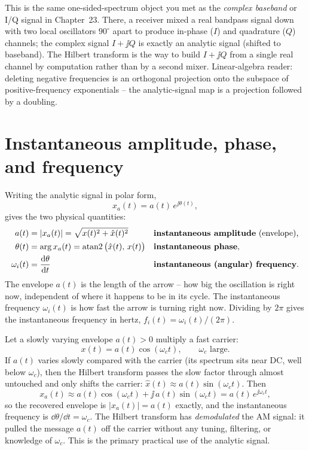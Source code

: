 \begin{connectionbox}
This is the same one-sided-spectrum object you met as the \emph{complex baseband} or I/Q
signal in Chapter~23. There, a receiver mixed a real bandpass signal down with two local
oscillators $90^\circ$ apart to produce in-phase ($I$) and quadrature ($Q$) channels;
the complex signal $I + \jj Q$ is exactly an analytic signal (shifted to baseband). The
Hilbert transform is the way to build $I + \jj Q$ from a single real channel by
computation rather than by a second mixer. Linear-algebra reader: deleting negative
frequencies is an orthogonal projection onto the subspace of positive-frequency
exponentials -- the analytic-signal map is a projection followed by a doubling.
\end{connectionbox}

\section{Instantaneous amplitude, phase, and frequency}
\label{ch25:instantaneous}

Writing the analytic signal in polar form,
\begin{equation}
\label{ch25:polar}
x_a(t) = a(t)\, e^{\jj\theta(t)},
\end{equation}
gives the two physical quantities:
\begin{align}
\label{ch25:env}
a(t) &= \lvert x_a(t)\rvert = \sqrt{x(t)^2 + \hat{x}(t)^2}
       && \text{\textbf{instantaneous amplitude} (envelope),}\\
\label{ch25:phase}
\theta(t) &= \arg x_a(t) = \operatorname{atan2}\big(\hat{x}(t),\,x(t)\big)
       && \text{\textbf{instantaneous phase},}\\
\label{ch25:ifreq}
\omega_i(t) &= \frac{\mathrm{d}\theta}{\mathrm{d} t}
       && \text{\textbf{instantaneous (angular) frequency}.}
\end{align}
The envelope $a(t)$ is the length of the arrow -- how big the oscillation is right now,
independent of where it happens to be in its cycle. The instantaneous frequency
$\omega_i(t)$ is how fast the arrow is turning right now. Dividing by $2\pi$ gives the
instantaneous frequency in hertz, $f_i(t) = \omega_i(t)/(2\pi)$.

\begin{example}
\label{ch25:ex-am}
Let a slowly varying envelope $a(t)>0$ multiply a fast carrier:
\[
x(t) = a(t)\cos(\omega_c t),\qquad \omega_c \text{ large}.
\]
If $a(t)$ varies slowly compared with the carrier (its spectrum sits near DC, well below
$\omega_c$), then the Hilbert transform passes the slow factor through almost untouched
and only shifts the carrier: $\hat{x}(t)\approx a(t)\sin(\omega_c t)$. Then
\[
x_a(t) \approx a(t)\cos(\omega_c t) + \jj\,a(t)\sin(\omega_c t) = a(t)\,e^{\jj\omega_c t},
\]
so the recovered envelope is $|x_a(t)| = a(t)$ exactly, and the instantaneous frequency is
$\dd\theta/\dd t = \omega_c$. The Hilbert transform has \emph{demodulated} the AM signal:
it pulled the message $a(t)$ off the carrier without any tuning, filtering, or knowledge
of $\omega_c$. This is the primary practical use of the analytic signal.
\end{example}

